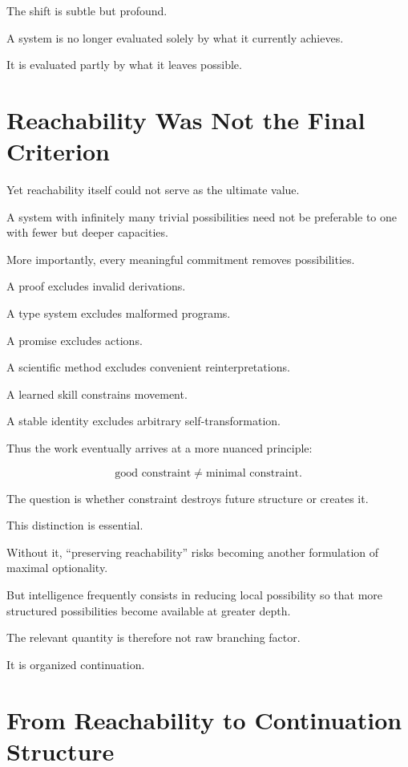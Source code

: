 \documentclass[11pt]{article}
\theoremstyle{remark}
\begin{document}
The shift is subtle but profound.

A system is no longer evaluated solely by what it currently achieves.

It is evaluated partly by what it leaves possible.

\section{Reachability Was Not the Final Criterion}

Yet reachability itself could not serve as the ultimate value.

A system with infinitely many trivial possibilities need not be preferable to one with fewer but deeper capacities.

More importantly, every meaningful commitment removes possibilities.

A proof excludes invalid derivations.

A type system excludes malformed programs.

A promise excludes actions.

A scientific method excludes convenient reinterpretations.

A learned skill constrains movement.

A stable identity excludes arbitrary self-transformation.

Thus the work eventually arrives at a more nuanced principle:

\begin{equation}
\text{good constraint}
\neq
\text{minimal constraint}.
\end{equation}

The question is whether constraint destroys future structure or creates it.

This distinction is essential.

Without it, ``preserving reachability'' risks becoming another formulation of maximal optionality.

But intelligence frequently consists in reducing local possibility so that more structured possibilities become available at greater depth.

The relevant quantity is therefore not raw branching factor.

It is organized continuation.

\section{From Reachability to Continuation Structure}
\end{document}

